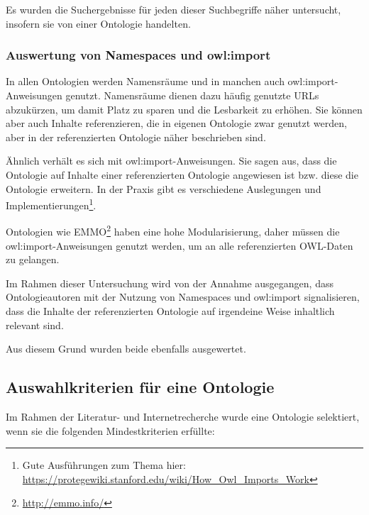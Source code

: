 \documentclass{article}
\begin{document}
Es wurden die Suchergebnisse für jeden dieser Suchbegriffe näher untersucht, insofern sie von einer Ontologie handelten.

\subsubsection{Auswertung von Namespaces und owl:import}

In allen Ontologien werden Namensräume und in manchen auch owl:import-Anweisungen genutzt.
Namensräume dienen dazu häufig genutzte URLs abzukürzen, um damit Platz zu sparen und die Lesbarkeit zu erhöhen.
Sie können aber auch Inhalte referenzieren, die in eigenen Ontologie zwar genutzt werden, aber in der referenzierten Ontologie näher beschrieben sind.

Ähnlich verhält es sich mit owl:import-Anweisungen. Sie sagen aus, dass die Ontologie auf Inhalte einer referenzierten Ontologie angewiesen ist bzw. diese die Ontologie erweitern.
In der Praxis gibt es verschiedene Auslegungen und Implementierungen\footnote{Gute Ausführungen zum Thema hier: \url{https://protegewiki.stanford.edu/wiki/How_Owl_Imports_Work}}.

Ontologien wie EMMO\footnote{\url{http://emmo.info/}} haben eine hohe Modularisierung, daher müssen die owl:import-Anweisungen genutzt werden, um an alle referenzierten OWL-Daten zu gelangen.

Im Rahmen dieser Untersuchung wird von der Annahme ausgegangen, dass Ontologieautoren mit der Nutzung von Namespaces und owl:import signalisieren, dass die Inhalte der referenzierten Ontologie auf irgendeine Weise inhaltlich relevant sind.

Aus diesem Grund wurden beide ebenfalls ausgewertet.

\subsection{Auswahlkriterien für eine Ontologie}

Im Rahmen der Literatur- und Internetrecherche wurde eine Ontologie selektiert, wenn sie die folgenden Mindestkriterien erfüllte:
\end{document}
